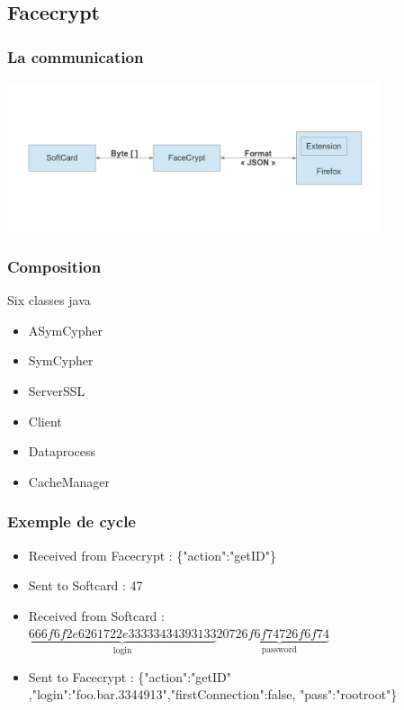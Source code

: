 \documentclass{beamer}
\begin{document}
\subsection{Facecrypt}
\begin{frame}
    \frametitle{La communication}
    \includegraphics[width=11cm]{schema_dolby}
\end{frame}

\begin{frame}
    \frametitle{Composition}
    \begin{block}{Six classes java}
        \begin{itemize}
            \item ASymCypher
            \item SymCypher
            \item ServerSSL
            \item Client
            \item Dataprocess
            \item CacheManager
        \end{itemize}
    \end{block}
\end{frame}

\begin{frame}
    \frametitle{Exemple de cycle}

    \begin{itemize}
        \item Received from Facecrypt : \{"action":"getID"\}
        \item Sent to Softcard : 47
        \item Received from Softcard : $\underbrace{666f6f2e6261722e33333434393133}_{\textrm{login}} 20 \underbrace{726f6f74726f6f74}_{\textrm{password}}$
        \item Sent to Facecrypt : \{"action":"getID" ,"login":"foo.bar.3344913","firstConnection":false, "pass":"rootroot"\}
    \end{itemize}

\end{frame}
\end{document}
